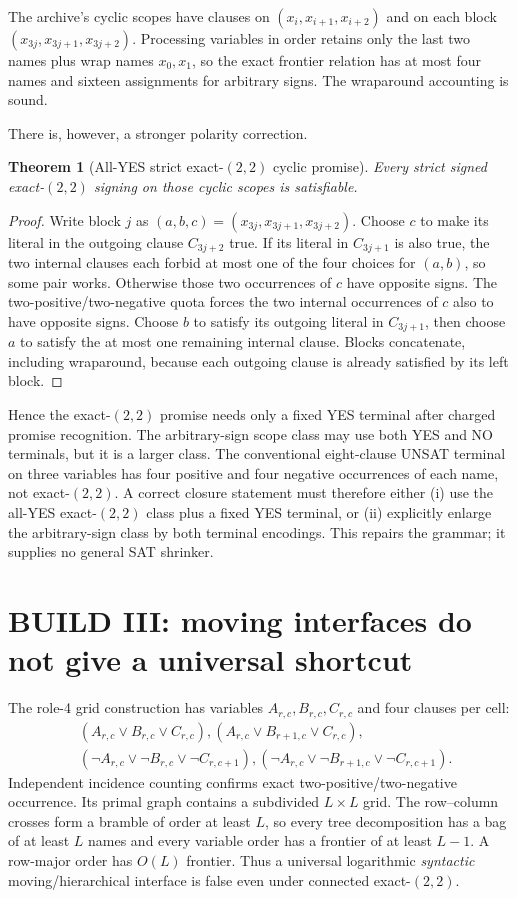 \documentclass[11pt]{article}
\newtheorem{theorem}{Theorem}
\begin{document}
The archive's cyclic scopes have clauses on
$(x_i,x_{i+1},x_{i+2})$ and on each block
$(x_{3j},x_{3j+1},x_{3j+2})$.  Processing variables in order retains only the
last two names plus wrap names $x_0,x_1$, so the exact frontier relation has
at most four names and sixteen assignments for arbitrary signs.  The
wraparound accounting is sound.

There is, however, a stronger polarity correction.
\begin{theorem}[All-YES strict exact-$(2,2)$ cyclic promise]
Every strict signed exact-$(2,2)$ signing on those cyclic scopes is
satisfiable.
\end{theorem}
\begin{proof}
Write block $j$ as $(a,b,c)=(x_{3j},x_{3j+1},x_{3j+2})$.  Choose $c$ to make
its literal in the outgoing clause $C_{3j+2}$ true.  If its literal in
$C_{3j+1}$ is also true, the two internal clauses each forbid at most one of
the four choices for $(a,b)$, so some pair works.  Otherwise those two
occurrences of $c$ have opposite signs.  The two-positive/two-negative quota
forces the two internal occurrences of $c$ also to have opposite signs.
Choose $b$ to satisfy its outgoing literal in $C_{3j+1}$, then choose $a$ to
satisfy the at most one remaining internal clause.  Blocks concatenate,
including wraparound, because each outgoing clause is already satisfied by
its left block.
\end{proof}

Hence the exact-$(2,2)$ promise needs only a fixed YES terminal after charged
promise recognition.  The arbitrary-sign scope class may use both YES and NO
terminals, but it is a larger class.  The conventional eight-clause UNSAT
terminal on three variables has four positive and four negative occurrences
of each name, not exact-$(2,2)$.  A correct closure statement must therefore
either (i) use the all-YES exact-$(2,2)$ class plus a fixed YES terminal, or
(ii) explicitly enlarge the arbitrary-sign class by both terminal encodings.
This repairs the grammar; it supplies no general SAT shrinker.

\section{BUILD III: moving interfaces do not give a universal shortcut}
The role-4 grid construction has variables $A_{r,c},B_{r,c},C_{r,c}$ and four
clauses per cell:
\begin{align*}
 &(A_{r,c}\vee B_{r,c}\vee C_{r,c}),
 (A_{r,c}\vee B_{r+1,c}\vee C_{r,c}),\\
 &(\neg A_{r,c}\vee\neg B_{r,c}\vee\neg C_{r,c+1}),
 (\neg A_{r,c}\vee\neg B_{r+1,c}\vee\neg C_{r,c+1}).
\end{align*}
Independent incidence counting confirms exact two-positive/two-negative
occurrence.  Its primal graph contains a subdivided $L\times L$ grid.  The
row--column crosses form a bramble of order at least $L$, so every tree
decomposition has a bag of at least $L$ names and every variable order has a
frontier of at least $L-1$.  A row-major order has $O(L)$ frontier.  Thus a
universal logarithmic \emph{syntactic} moving/hierarchical interface is false
even under connected exact-$(2,2)$.
\end{document}
